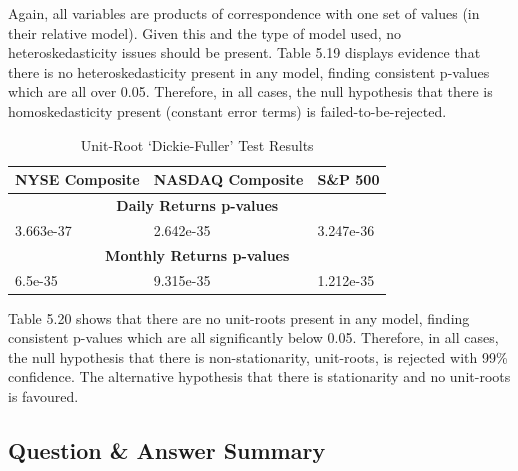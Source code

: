 \documentclass[11pt, english]{article}
\begin{document}
	Again, all variables are products of correspondence with one set of values (in their relative model). Given this and the type of model used, no heteroskedasticity issues should be present. Table 5.19 displays evidence that there is no heteroskedasticity present in any model, finding consistent p-values which are all over 0.05. Therefore, in all cases, the null hypothesis that there is homoskedasticity present (constant error terms) is failed-to-be-rejected.

	\newpage

	\begin{table}[h]
		\scriptsize
		\renewcommand{\arraystretch}{1.25}
	\begin{center}
	\begin{tabular}{p{3.5cm}p{3.5cm}p{3.5cm}}
		\textbf{NYSE Composite} & \textbf{NASDAQ Composite} & \textbf{S\&P 500}\\
		\hline
		\multicolumn{3}{c}{\textbf{Daily Returns p-values}}\\
		\hline
		3.663e-37 & 2.642e-35 & 3.247e-36\\
		\hline
		\multicolumn{3}{c}{\textbf{Monthly Returns p-values}}\\
		\hline
		6.5e-35 & 9.315e-35 & 1.212e-35\\
		\hline
	\end{tabular}
		\caption{Unit-Root `Dickie-Fuller’ Test Results}
	\end{center}
	\end{table}

	Table 5.20 shows that there are no unit-roots present in any model, finding consistent p-values which are all significantly below 0.05. Therefore, in all cases, the null hypothesis that there is non-stationarity, unit-roots, is rejected with 99\% confidence. The alternative hypothesis that there is stationarity and no unit-roots is favoured.

	\newpage 

	\subsection{Question \& Answer Summary}
\end{document}
